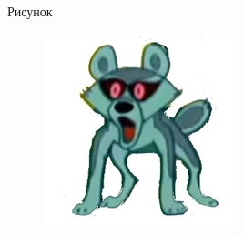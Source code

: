 \documentclass[11pt]{beamer}
\begin{document}
\begin{frame}{Рисунок}
\begin{figure}[H]
	\includegraphics[scale=0.4]{../pics/shakal.png}
	\label{fig:shakal}
\end{figure}
\end{frame}
\end{document}
